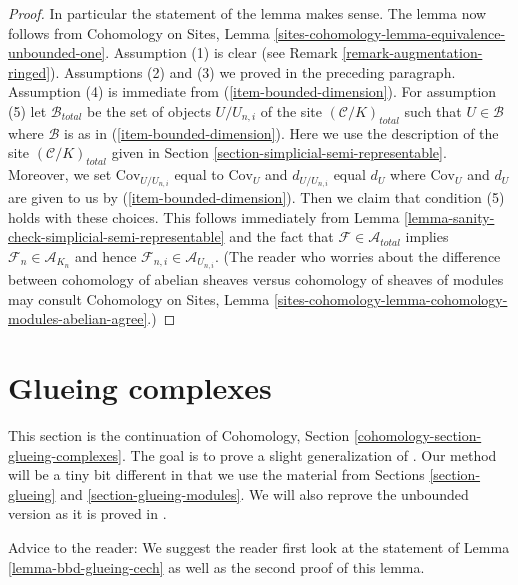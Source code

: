 \documentclass{stacks-project}
\theoremstyle{plain}
\theoremstyle{definition}
\theoremstyle{remark}
\numberwithin{equation}{subsection}
\begin{document}
\begin{proof}
\medskip\noindent
In particular the statement of the lemma makes sense.
The lemma now follows from Cohomology on Sites,
Lemma \ref{sites-cohomology-lemma-equivalence-unbounded-one}.
Assumption (1) is clear (see Remark \ref{remark-augmentation-ringed}).
Assumptions (2) and (3) we proved in the preceding paragraph.
Assumption (4) is immediate from (\ref{item-bounded-dimension}).
For assumption (5) let $\mathcal{B}_{total}$ be the set of
objects $U/U_{n, i}$ of the site $(\mathcal{C}/K)_{total}$
such that $U \in \mathcal{B}$ where $\mathcal{B}$ is as in
(\ref{item-bounded-dimension}). Here we use the description of
the site $(\mathcal{C}/K)_{total}$ given in
Section \ref{section-simplicial-semi-representable}.
Moreover, we set $\text{Cov}_{U/U_{n, i}}$ equal to $\text{Cov}_U$
and $d_{U/U_{n, i}}$ equal $d_U$ where $\text{Cov}_U$ and $d_U$
are given to us by (\ref{item-bounded-dimension}).
Then we claim that condition (5) holds with these choices.
This follows immediately from
Lemma \ref{lemma-sanity-check-simplicial-semi-representable}
and the fact that $\mathcal{F} \in \mathcal{A}_{total}$
implies $\mathcal{F}_n \in \mathcal{A}_{K_n}$ and hence
$\mathcal{F}_{n, i} \in \mathcal{A}_{U_{n, i}}$.
(The reader who worries about the difference between
cohomology of abelian sheaves versus cohomology
of sheaves of modules may consult Cohomology on Sites, Lemma
\ref{sites-cohomology-lemma-cohomology-modules-abelian-agree}.)
\end{proof}










\section{Glueing complexes}
\label{section-glueing-complexes}

\noindent
This section is the continuation of
Cohomology, Section \ref{cohomology-section-glueing-complexes}.
The goal is to prove a slight generalization of \cite[Theorem 3.2.4]{BBD}.
Our method will be a tiny bit different in that we use
the material from Sections \ref{section-glueing} and
\ref{section-glueing-modules}. We will also reprove the
unbounded version as it is proved in \cite{six-I}.

\medskip\noindent
Advice to the reader: We suggest the reader first look at the statement of
Lemma \ref{lemma-bbd-glueing-cech} as well as the second proof of this lemma.
\end{document}
